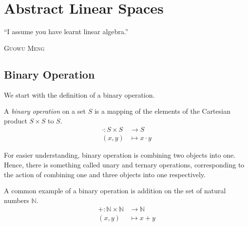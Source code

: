\documentclass[
	11pt, %
	fleqn, %
	a4paper, %
]{LegrandOrangeBook}
\let\originalepigraph\epigraph
\renewcommand\epigraph[2]{\originalepigraph{#1}{\textsc{#2}}}
\begin{document}

\chapterspaceabove{8cm} %
\chapterspacebelow{8cm} %

\chapter{Abstract Linear Spaces}

\epigraph{``I assume you have learnt linear algebra.''}{Guowu Meng}

\section{Binary Operation}

We start with the definition of a binary operation.

\begin{definition}
    A \emph{binary operation} on a set $S$ is a mapping of the elements of the Cartesian product $S \times S$ to $S$.
    \[ \begin{split}
            \cdot : S \times S & \to S \\ (x,y) &\mapsto x \cdot y
        \end{split}\]
\end{definition}

For easier understanding, binary operation is combining two objects into one. Hence, there is something called unary and ternary operations, corresponding to the action of combining one and three objects into one respectively.

\begin{example}
    A common example of a binary operation is addition on the set of natural numbers $\mathbb{N}$.
    \begin{equation}
        \begin{split}
            + : \mathbb{N} \times \mathbb{N} & \to \mathbb{N} \\ (x,y) &\mapsto x+y
        \end{split}
    \end{equation}
\end{example}
\end{document}
